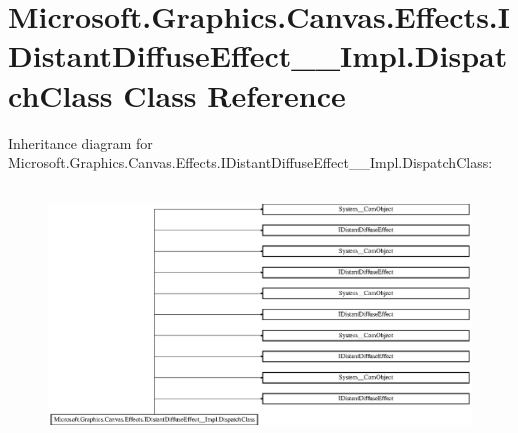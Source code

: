 \hypertarget{class_microsoft_1_1_graphics_1_1_canvas_1_1_effects_1_1_i_distant_diffuse_effect_____impl_1_1_dispatch_class}{}\section{Microsoft.\+Graphics.\+Canvas.\+Effects.\+I\+Distant\+Diffuse\+Effect\+\_\+\+\_\+\+Impl.\+Dispatch\+Class Class Reference}
\label{class_microsoft_1_1_graphics_1_1_canvas_1_1_effects_1_1_i_distant_diffuse_effect_____impl_1_1_dispatch_class}
Inheritance diagram for Microsoft.\+Graphics.\+Canvas.\+Effects.\+I\+Distant\+Diffuse\+Effect\+\_\+\+\_\+\+Impl.\+Dispatch\+Class\+:\begin{figure}[H]
\begin{center}
\leavevmode
\includegraphics[height=6.754386cm]{class_microsoft_1_1_graphics_1_1_canvas_1_1_effects_1_1_i_distant_diffuse_effect_____impl_1_1_dispatch_class}
\end{center}
\end{figure}
